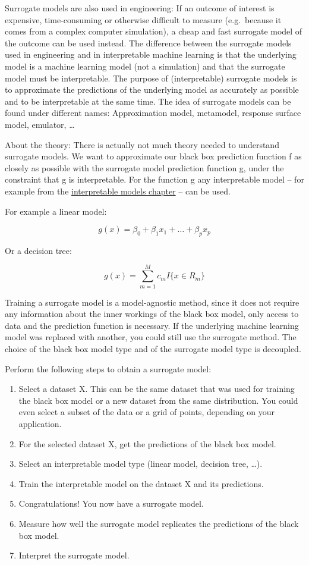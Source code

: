 \documentclass[
  10pt,
]{scrbook}
\providecommand{\tightlist}{%
  \setlength{\itemsep}{0pt}\setlength{\parskip}{0pt}}
\begin{document}
Surrogate models are also used in engineering:
If an outcome of interest is expensive, time-consuming or otherwise difficult to measure (e.g.~because it comes from a complex computer simulation), a cheap and fast surrogate model of the outcome can be used instead.
The difference between the surrogate models used in engineering and in interpretable machine learning is that the underlying model is a machine learning model (not a simulation) and that the surrogate model must be interpretable.
The purpose of (interpretable) surrogate models is to approximate the predictions of the underlying model as accurately as possible and to be interpretable at the same time.
The idea of surrogate models can be found under different names:
Approximation model, metamodel, response surface model, emulator, \ldots{}

About the theory:
There is actually not much theory needed to understand surrogate models.
We want to approximate our black box prediction function f as closely as possible with the surrogate model prediction function g, under the constraint that g is interpretable.
For the function g any interpretable model -- for example from the \protect\hyperlink{simple}{interpretable models chapter} -- can be used.

For example a linear model:

\[g(x)=\beta_0+\beta_1{}x_1{}+\ldots+\beta_p{}x_p\]

Or a decision tree:

\[g(x)=\sum_{m=1}^Mc_m{}I\{x\in{}R_m\}\]

Training a surrogate model is a model-agnostic method, since it does not require any information about the inner workings of the black box model, only access to data and the prediction function is necessary.
If the underlying machine learning model was replaced with another, you could still use the surrogate method.
The choice of the black box model type and of the surrogate model type is decoupled.

Perform the following steps to obtain a surrogate model:

\begin{enumerate}
\def\labelenumi{\arabic{enumi}.}
\tightlist
\item
  Select a dataset X.
  This can be the same dataset that was used for training the black box model or a new dataset from the same distribution.
  You could even select a subset of the data or a grid of points, depending on your application.
\item
  For the selected dataset X, get the predictions of the black box model.
\item
  Select an interpretable model type (linear model, decision tree, \ldots).
\item
  Train the interpretable model on the dataset X and its predictions.
\item
  Congratulations! You now have a surrogate model.
\item
  Measure how well the surrogate model replicates the predictions of the black box model.
\item
  Interpret the surrogate model.
\end{enumerate}
\end{document}
